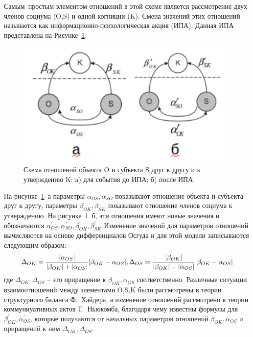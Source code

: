 Самым~простым элементом отношений в этой схеме является рассмотрение двух членов социума (O,S) и одной когниции (K).
Смена значений этих отношений называется как информационно-психологическая акция (ИПА).
Данная ИПА представлена на Рисунке~\ref{fig:shema_OSK}.
\begin{figure}[h!]
    \centering
    \captionsetup{justification=centering}
    \includegraphics[width=0.7\linewidth]{pictures/schema_OSK.png}
    \caption{Схема отношений объекта O и субъекта S друг к другу и к утверждению K: a)
    для события до ИПА; б) после ИПА~\citep{pilkevich2015model}}
    \label{fig:shema_OSK}
\end{figure}
На рисунке~\ref{fig:shema_OSK}~а параметры $\alpha_{OS}, \alpha_{SO}$ показывают отношение объекта и субъекта
друг к другу, параметры $\beta_{OK}, \beta_{SK}$ показывают отношение членов социума к утверждению.
На рисунке~\ref{fig:shema_OSK}~б, эти отношения имеют новые значения и обозначаются
$\alpha^{\prime}_{OS}, \alpha^{\prime}_{SO}, \beta^{\prime}_{OK}, \beta^{\prime}_{SK}$
Изменение значений для параметров отношений вычисляются на основе дифференциалов Осгуда и для этой модели
записываются следующим образом:
\begin{equation}
    \Delta_{OK} = \frac{|\alpha_{OS}|}{|\beta_{OK}|+|\alpha_{OS}|} |\beta_{OK}-\alpha_{OS}|,\\
    \Delta_{OS} = \frac{|\beta_{OK}|}{|\beta_{OK}|+|\alpha_{OS}|} |\beta_{OK}-\alpha_{OS}|
\end{equation}
где $\Delta_{OK}, \Delta_{OS}$ – это приращение к $\beta_{OK}, \alpha_{OS}$ соответственно.
Различные ситуации взаимоотношений между элементами {O,S,K} были рассмотрены в теории структурного
баланса Ф.~Хайдера, а изменение отношений рассмотрено в теории коммуниуативных актов Т.~Ньюкомба,
благодаря чему известны формулы для $\beta^{\prime}_{OK}, \alpha^{\prime}_{OS}$, которые получаются
от начальных параметров отношений $\beta_{OK}, \alpha_{OS}$ и приращений к ним $\Delta_{OK}, \Delta_{OS}$.

